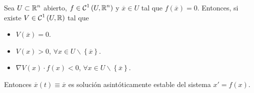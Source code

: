 \begin{theorem}
Sea $\displaystyle U \subset\mathbb{R}^{n} $ abierto, $\displaystyle f \in \mathcal{C}^{1}\left(U, \mathbb{R}^{n}\right) $ y $\displaystyle \overline{x}\in U $ tal que $\displaystyle f\left(\overline{x}\right)=0 $. Entonces, si existe $\displaystyle V\in \mathcal{C}^{1}\left(U, \mathbb{R}\right) $ tal que 
\begin{itemize}
\item $\displaystyle V\left(\overline{x}\right)=0 $.
\item $\displaystyle V\left(x\right) > 0 $, $\displaystyle\forall x \in U \backslash \left\{ \overline{x}\right\}  $. 
\item $\displaystyle \nabla V\left(x\right) \cdot f\left(x\right) < 0 $, $\displaystyle \forall x \in U \backslash \left\{ \overline{x}\right\} $. 
\end{itemize}
Entonces $\displaystyle \overline{x}\left(t\right)\equiv \overline{x} $ es solución asintóticamente estable del sistema $\displaystyle x ' = f\left(x\right) $. 
\end{theorem}
